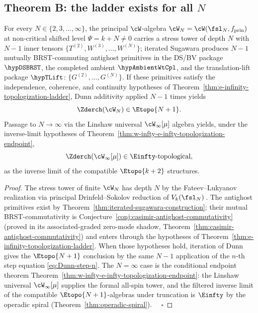 \subsection{Theorem B: the ladder exists for all $N$}
\label{sec:part-vi-theorem-B}

\begin{theorem}
\label{thm:part-vi-ladder-exists}
For every $N \in \{2, 3, \ldots, \infty\}$, the principal
$\cW$-algebra $\cW_N = \cW(\fsl_N, f_{\mathrm{prin}})$ at non-critical
shifted level $\Psi = k+N \ne 0$ carries a stress tower
of depth $N$ with $N-1$ inner tensors
$\{T^{(2)}, W^{(3)}, \ldots, W^{(N)}\}$; iterated Sugawara produces
$N-1$ mutually BRST-commuting antighost primitives in the
DS/BV package \(\hypDSBRST\), the completed ambient
\(\hypAmbientWtCpl\), and the translation-lift package \(\hypTLift\):
$\{G^{(2)}, \ldots, G^{(N)}\}$. If these primitives satisfy the
independence, coherence, and continuity hypotheses of
Theorem~\ref{thm:e-infinity-topologization-ladder}, Dunn additivity
applied $N-1$ times yields
\begin{equation}
 \Zderch(\cW_N) \in \Etopo{N+1}.
\end{equation}
Passage to $N \to \infty$ via the Linshaw universal
$\cW_\infty[\mu]$ algebra yields, under the inverse-limit hypotheses of
Theorem~\ref{thm:w-infty-e-infty-topologization-endpoint},
\begin{equation}
 \Zderch(\cW_\infty[\mu]) \in \Einfty\text{-topological},
\end{equation}
as the inverse limit of the compatible $\Etopo{k+2}$ structures.
\end{theorem}
\begin{proof}
The stress tower of finite $\cW_N$ has depth $N$ by the Fateev--Lukyanov
realization via principal Drinfeld--Sokolov reduction of
$V_k(\fsl_N)$\,\cite{FateevLukyanov}. The antighost primitives exist by
Theorem~\ref{thm:iterated-sugawara-construction}; their mutual
BRST-commutativity is
Conjecture~\ref{conj:casimir-antighost-commutativity} (proved in its
associated-graded zero-mode shadow,
Theorem~\ref{thm:casimir-antighost-commutativity}) and enters through
the hypotheses of
Theorem~\ref{thm:e-infinity-topologization-ladder}.
When those hypotheses
hold, iteration of Dunn gives the $\Etopo{N+1}$ conclusion by the same
$N-1$ application of the $n$-th step equation \eqref{eq:Dunn-step-n}.
The $N=\infty$ case is the conditional endpoint theorem
Theorem~\ref{thm:w-infty-e-infty-topologization-endpoint}: the Linshaw
universal $\cW_\infty[\mu]$ supplies the formal all-spin tower, and
the filtered inverse limit of the compatible $\Etopo{N+1}$-algebras
under truncation is
$\Einfty$ by the operadic spiral (Theorem~\ref{thm:operadic-spiral}).
$\quad\square$
\end{proof}

